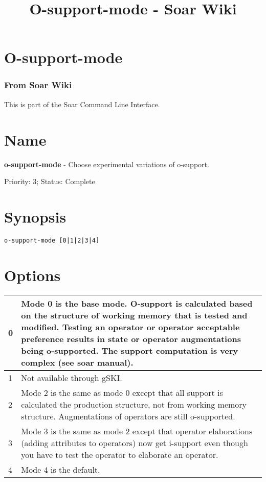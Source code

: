 \documentclass[10pt]{article}
\title{O-support-mode - Soar Wiki}
\begin{document}
\section*{O-support-mode}
\subsubsection*{From Soar Wiki}


 This is part of the Soar Command Line Interface. 
\section*{ Name }


 \textbf{o-support-mode}
 - Choose experimental variations of o-support. 


 Priority: 3; Status: Complete
\section*{ Synopsis }
\begin{verbatim}
o-support-mode [0|1|2|3|4]

\end{verbatim}
\section*{ Options }


\begin{tabular}{|p{1in}|p{5in}|}
\hline 
 0  & Mode 0 is the base mode. O-support is calculated based on the structure of working memory that is tested and modified. Testing an operator or operator acceptable preference results in state or operator augmentations being o-supported. The support computation is very complex (see soar manual).  \\
 \hline 
 1  & Not available through gSKI.  \\
 \hline 
 2  & Mode 2 is the same as mode 0 except that all support is calculated the production structure, not from working memory structure. Augmentations of operators are still o-supported.  \\
 \hline 
 3  & Mode 3 is the same as mode 2 except that operator elaborations (adding attributes to operators) now get i-support even though you have to test the operator to elaborate an operator.  \\
 \hline 
 4  & Mode 4 is the default.  \\
 \hline 

\end{tabular}
\end{document}
